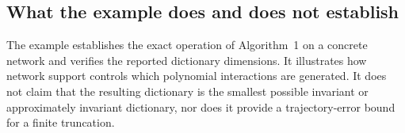 \subsection{What the example does and does not establish}

The example establishes the exact operation of Algorithm~1 on a concrete
network and verifies the reported dictionary dimensions. It illustrates how
network support controls which polynomial interactions are generated. It does
not claim that the resulting dictionary is the smallest possible invariant or
approximately invariant dictionary, nor does it provide a trajectory-error
bound for a finite truncation.
